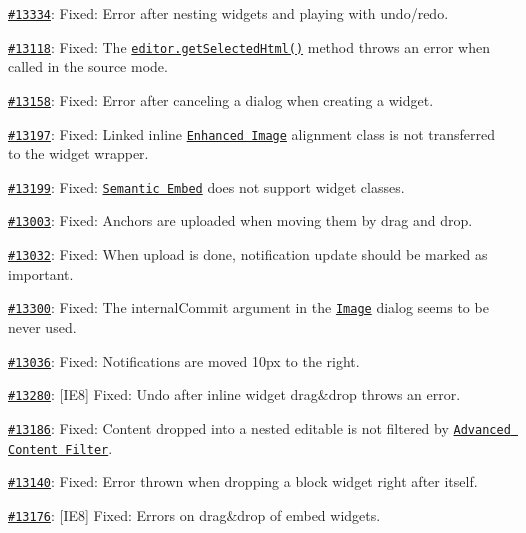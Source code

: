 \begin{DoxyItemize}
\item \href{http://dev.ckeditor.com/ticket/13334}{\tt \#13334}\+: Fixed\+: Error after nesting widgets and playing with undo/redo.
\item \href{http://dev.ckeditor.com/ticket/13118}{\tt \#13118}\+: Fixed\+: The \href{http://docs.ckeditor.com/#!/api/CKEDITOR.editor-method-getSelectedHtml}{\tt {\ttfamily editor.\+get\+Selected\+Html()}} method throws an error when called in the source mode.
\item \href{http://dev.ckeditor.com/ticket/13158}{\tt \#13158}\+: Fixed\+: Error after canceling a dialog when creating a widget.
\item \href{http://dev.ckeditor.com/ticket/13197}{\tt \#13197}\+: Fixed\+: Linked inline \href{http://ckeditor.com/addon/image2}{\tt Enhanced Image} alignment class is not transferred to the widget wrapper.
\item \href{http://dev.ckeditor.com/ticket/13199}{\tt \#13199}\+: Fixed\+: \href{http://ckeditor.com/addon/embedsemantic}{\tt Semantic Embed} does not support widget classes.
\item \href{http://dev.ckeditor.com/ticket/13003}{\tt \#13003}\+: Fixed\+: Anchors are uploaded when moving them by drag and drop.
\item \href{http://dev.ckeditor.com/ticket/13032}{\tt \#13032}\+: Fixed\+: When upload is done, notification update should be marked as important.
\item \href{http://dev.ckeditor.com/ticket/13300}{\tt \#13300}\+: Fixed\+: The {\ttfamily internal\+Commit} argument in the \href{http://ckeditor.com/addon/image}{\tt Image} dialog seems to be never used.
\item \href{http://dev.ckeditor.com/ticket/13036}{\tt \#13036}\+: Fixed\+: Notifications are moved 10px to the right.
\item \href{http://dev.ckeditor.com/ticket/13280}{\tt \#13280}\+: \mbox{[}I\+E8\mbox{]} Fixed\+: Undo after inline widget drag\&drop throws an error.
\item \href{http://dev.ckeditor.com/ticket/13186}{\tt \#13186}\+: Fixed\+: Content dropped into a nested editable is not filtered by \href{http://docs.ckeditor.com/#!/guide/dev_acf}{\tt Advanced Content Filter}.
\item \href{http://dev.ckeditor.com/ticket/13140}{\tt \#13140}\+: Fixed\+: Error thrown when dropping a block widget right after itself.
\item \href{http://dev.ckeditor.com/ticket/13176}{\tt \#13176}\+: \mbox{[}I\+E8\mbox{]} Fixed\+: Errors on drag\&drop of embed widgets.

\end{DoxyItemize}
